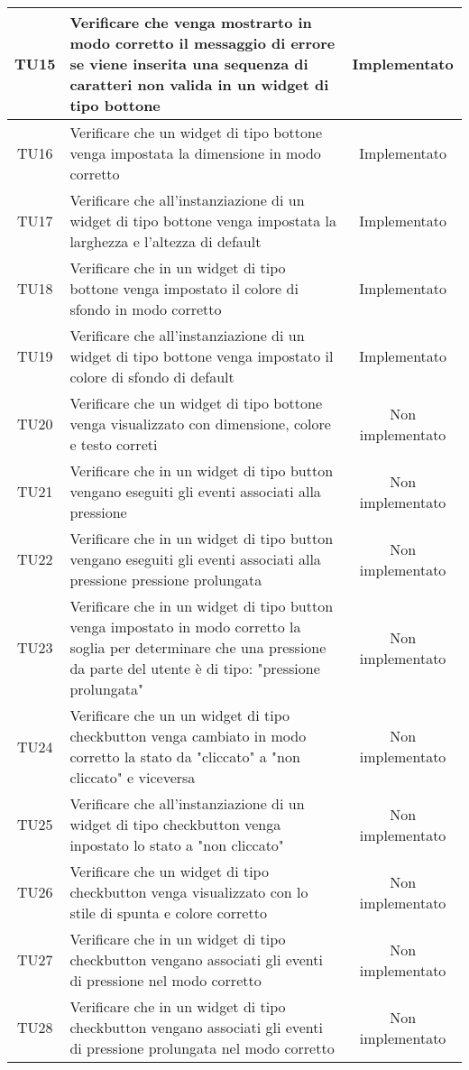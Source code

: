 \begin{center}
\begin{longtable}{|c|>{\centering}m{10cm}|c|}
		TU15 & Verificare che venga mostrarto in modo corretto il messaggio di errore se viene inserita una sequenza di caratteri non valida in un widget di tipo bottone & Implementato \\ \hline
		TU16 & Verificare che un widget di tipo bottone venga impostata la dimensione in modo corretto & Implementato \\ \hline
		TU17 & Verificare che all'instanziazione di un widget di tipo bottone venga impostata la larghezza e l'altezza di default & Implementato \\ \hline
		TU18 & Verificare che in un widget di tipo bottone venga impostato il colore di sfondo in modo corretto & Implementato \\ \hline
		TU19 & Verificare che all'instanziazione di un widget di tipo bottone venga impostato il colore di sfondo di default & Implementato \\ \hline
		TU20 & Verificare che un widget di tipo bottone venga visualizzato con dimensione, colore e testo correti & Non implementato \\ \hline
		TU21 & Verificare che in un widget di tipo button vengano eseguiti gli eventi associati alla pressione & Non implementato \\ \hline
		TU22 & Verificare che in un widget di tipo button vengano eseguiti gli eventi associati alla pressione pressione prolungata & Non implementato \\ \hline
		TU23 & Verificare che in un widget di tipo button venga impostato in modo corretto la soglia per determinare che una pressione da parte del utente è di tipo: "pressione prolungata" & Non implementato \\ \hline
		TU24 & Verificare che un un widget di tipo checkbutton venga cambiato in modo corretto la stato da "cliccato" a "non cliccato" e viceversa & Non implementato \\ \hline
		TU25 & Verificare che all'instanziazione di un widget di tipo checkbutton venga inpostato lo stato a "non cliccato" & Non implementato \\ \hline
		TU26 & Verificare che un widget di tipo checkbutton venga visualizzato con lo stile di spunta e colore corretto & Non implementato \\ \hline
		TU27 & Verificare che in un widget di tipo checkbutton vengano associati gli eventi di pressione nel modo corretto & Non implementato \\ \hline
		TU28 & Verificare che in un widget di tipo checkbutton vengano associati gli eventi di pressione prolungata nel modo corretto & Non implementato \\ \hline

\end{longtable}
\end{center}
